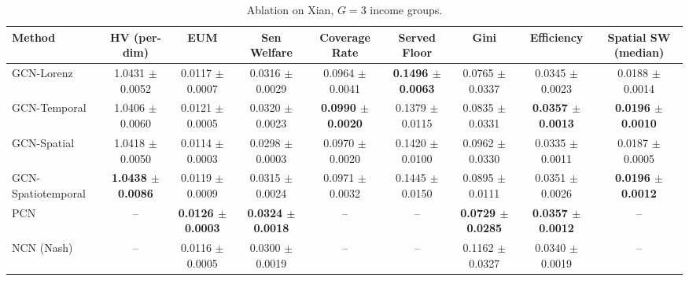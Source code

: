 \begin{table}[htbp]
\centering
\caption{Ablation on Xian, $G=3$ income groups.}
\label{tab:ablation_xian_g3}
\begin{tabular}{lcccccccc}
\toprule
Method & HV (per-dim) & EUM & Sen Welfare & Coverage Rate & Served Floor & Gini & Efficiency & Spatial SW (median) \\
\midrule
GCN-Lorenz & 1.0431 $\pm$ 0.0052 & 0.0117 $\pm$ 0.0007 & 0.0316 $\pm$ 0.0029 & 0.0964 $\pm$ 0.0041 & \textbf{0.1496 $\pm$ 0.0063} & 0.0765 $\pm$ 0.0337 & 0.0345 $\pm$ 0.0023 & 0.0188 $\pm$ 0.0014 \\
GCN-Temporal & 1.0406 $\pm$ 0.0060 & 0.0121 $\pm$ 0.0005 & 0.0320 $\pm$ 0.0023 & \textbf{0.0990 $\pm$ 0.0020} & 0.1379 $\pm$ 0.0115 & 0.0835 $\pm$ 0.0331 & \textbf{0.0357 $\pm$ 0.0013} & \textbf{0.0196 $\pm$ 0.0010} \\
GCN-Spatial & 1.0418 $\pm$ 0.0050 & 0.0114 $\pm$ 0.0003 & 0.0298 $\pm$ 0.0003 & 0.0970 $\pm$ 0.0020 & 0.1420 $\pm$ 0.0100 & 0.0962 $\pm$ 0.0330 & 0.0335 $\pm$ 0.0011 & 0.0187 $\pm$ 0.0005 \\
GCN-Spatiotemporal & \textbf{1.0438 $\pm$ 0.0086} & 0.0119 $\pm$ 0.0009 & 0.0315 $\pm$ 0.0024 & 0.0971 $\pm$ 0.0032 & 0.1445 $\pm$ 0.0150 & 0.0895 $\pm$ 0.0111 & 0.0351 $\pm$ 0.0026 & \textbf{0.0196 $\pm$ 0.0012} \\
PCN & -- & \textbf{0.0126 $\pm$ 0.0003} & \textbf{0.0324 $\pm$ 0.0018} & -- & -- & \textbf{0.0729 $\pm$ 0.0285} & \textbf{0.0357 $\pm$ 0.0012} & -- \\
NCN (Nash) & -- & 0.0116 $\pm$ 0.0005 & 0.0300 $\pm$ 0.0019 & -- & -- & 0.1162 $\pm$ 0.0327 & 0.0340 $\pm$ 0.0019 & -- \\
\bottomrule
\end{tabular}
\end{table}


